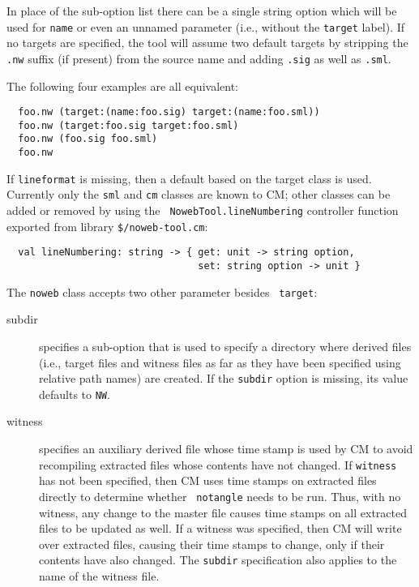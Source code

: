 \documentclass[titlepage,letterpaper]{article}
\begin{document}
In place of the sub-option list there can be a single string option
which will be used for {\tt name} or even an unnamed parameter (i.e.,
without the {\tt target} label).  If no targets are specified, the
tool will assume two default targets by stripping the {\tt .nw}
suffix (if present) from the source name and adding {\tt .sig} as well
as {\tt .sml}.

The following four examples are all equivalent:

\begin{verbatim}
  foo.nw (target:(name:foo.sig) target:(name:foo.sml))
  foo.nw (target:foo.sig target:foo.sml)
  foo.nw (foo.sig foo.sml)
  foo.nw
\end{verbatim}

If {\tt lineformat} is missing, then a default based on the target
class is used.  Currently only the {\tt sml} and {\tt cm} classes are
known to CM; other classes can be added or removed by using the {\tt
NowebTool.lineNumbering} controller function exported from library
{\tt \$/noweb-tool.cm}:

\begin{verbatim}
  val lineNumbering: string -> { get: unit -> string option,
                                 set: string option -> unit }
\end{verbatim}

The {\tt noweb} class accepts two other parameter besides {\tt
target}:

\begin{description}
\item[subdir] specifies a sub-option that is used to specify a
directory where derived files (i.e., target files and witness files as
far as they have been specified using relative path names) are
created.  If the {\tt subdir} option is missing, its value defaults to
{\tt NW}.
\item[witness] specifies an auxiliary derived file whose time stamp is
used by CM to avoid recompiling extracted files whose contents have
not changed.  If {\tt witness} has not been specified, then CM uses
time stamps on extracted files directly to determine whether {\tt
notangle} needs to be run.  Thus, with no witness, any change to the
master file causes time stamps on all extracted files to be updated as
well.  If a witness was specified, then CM will write over extracted
files, causing their time stamps to change, only if their contents
have also changed.  The {\tt subdir} specification also applies to the
name of the witness file.
\end{description}
\end{document}
